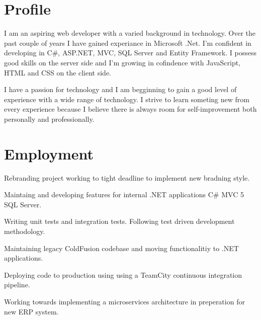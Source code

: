 \documentclass[a4paper]{deedy-resume} %
\newcommand{\Csh}{C{\lserif\#}}
\begin{document}
\hfill
%
%
\begin{minipage}[t]{0.66\textwidth} %

\section{Profile}
I am an aspiring web developer with a varied background in technology. Over the past couple of years I have gained experiance in Microsoft .Net. I'm confident in developing in \Csh{}, ASP.NET, MVC, SQL Server and Entity Framework. I possess good skills on the server side and I'm growing in cofindence with JavaScript, HTML and CSS on the client side. 

I have a passion for technology and I am begginning to gain a good level of experience with a wide range of technology. I strive to learn someting new from every experience because I believe there is always room for self-improvement both personally and professionally.
\sectionspace %

\section{Employment}


\vspace{\topsep} %
\begin{tightitemize}
\item Rebranding project working to tight deadline to implement new bradning style.
\item Maintaing and developing features for internal .NET applications \Csh{} MVC 5 SQL Server.
\item Writing unit tests and integration tests. Following test driven development methodology.
\item Maintaining legacy ColdFusion codebase and moving functionalitiy to .NET applications.
\item Deploying code to production using using a TeamCity continuous integration pipeline.
\item Working towards implementing a microservices architecture in preperation for new ERP system. 


\end{tightitemize}
\end{minipage}
\end{document}
